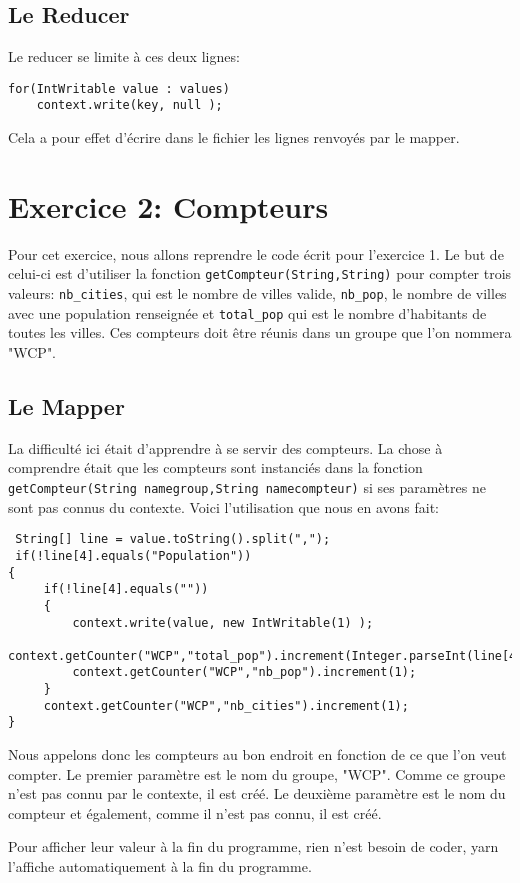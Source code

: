 \documentclass[a4paper]{article}
\begin{document}
\subsection{Le Reducer}
Le reducer se limite à ces deux lignes:
\begin{lstlisting}
for(IntWritable value : values)
	context.write(key, null );
\end{lstlisting}

Cela a pour effet d'écrire dans le fichier les lignes renvoyés par le mapper.

\section{Exercice 2: Compteurs}

Pour cet exercice, nous allons reprendre le code écrit pour l'exercice 1.
Le but de celui-ci est d'utiliser la fonction \verb?getCompteur(String,String)? pour compter trois valeurs: \verb?nb_cities?, 
qui est le nombre de villes valide, \verb?nb_pop?, le nombre de villes avec une population renseignée
et \verb?total_pop? qui est le nombre d'habitants de toutes les villes.
 Ces compteurs doit être réunis dans un groupe que l'on nommera "WCP".

\subsection{Le Mapper}

La difficulté ici était d'apprendre à se servir des compteurs. La chose à comprendre était que les compteurs sont instanciés dans la fonction \\ \verb?getCompteur(String namegroup,String namecompteur)? si ses paramètres ne sont pas connus du contexte. Voici l'utilisation que nous en avons fait:
\begin{lstlisting}
 String[] line = value.toString().split(",");
 if(!line[4].equals("Population"))
{
     if(!line[4].equals(""))
	 {
	     context.write(value, new IntWritable(1) );
	     context.getCounter("WCP","total_pop").increment(Integer.parseInt(line[4]));
	     context.getCounter("WCP","nb_pop").increment(1);
	 }
     context.getCounter("WCP","nb_cities").increment(1); 
}
\end{lstlisting}

Nous appelons donc les compteurs au bon endroit en fonction de ce que l'on veut compter. Le premier paramètre est le nom du groupe, "WCP". Comme ce groupe n'est pas connu par le contexte, il est créé. Le deuxième paramètre est le nom du compteur et également, comme il n'est pas connu, il est créé. 

Pour afficher leur valeur à la fin du programme, rien n'est besoin de coder, yarn l'affiche automatiquement à la fin du programme.
\end{document}
